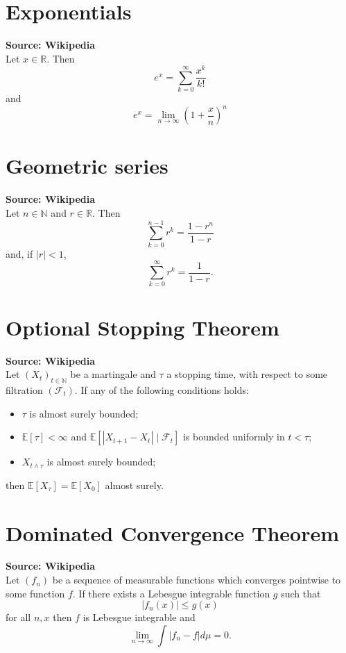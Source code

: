 \documentclass[fleqn]{article}
\newcommand{\E}{\mathbb{E}}
\newcommand{\1}[1]{\mathbb{I}_{#1}}
\begin{document}
\section{Exponentials}
\textbf{Source: Wikipedia} \\[10pt]
Let $x \in \mathbb{R}$.
Then
\begin{equation*}
e^x = \sum_{k=0}^\infty \frac{x^k}{k!}
\end{equation*}
and
\begin{equation*}
e^x = \lim_{n\to\infty} \left( 1+ \frac{x}{n} \right)^n
\end{equation*}


\section{Geometric series}
\textbf{Source: Wikipedia} \\[10pt]
Let $n\in\mathbb{N}$ and $r \in \mathbb{R}$.
Then
\begin{equation*}
\sum_{k=0}^{n-1} r^k = \frac{1-r^n}{1-r}
\end{equation*}
and, if $|r| <1$,
\begin{equation*}
\sum_{k=0}^\infty r^k = \frac{1}{1-r} .
\end{equation*}


\section{Optional Stopping Theorem}
\textbf{Source: Wikipedia} \\[10pt]
Let $(X_t)_{t\in\mathbb{N}}$ be a martingale and $\tau$ a stopping time, with respect to some filtration $(\mathcal{F}_t)$.
If any of the following conditions holds:
\begin{itemize}
\item $\tau$ is almost surely bounded;
\item $\E[\tau]<\infty$ and $\E[ |X_{t+1} - X_t| \mid \mathcal{F}_t]$ is bounded uniformly in $t<\tau$;
\item $X_{t\wedge\tau}$ is almost surely bounded;
\end{itemize}
then $\E[X_\tau] = \E[X_0]$ almost surely.


\section{Dominated Convergence Theorem}
\textbf{Source: Wikipedia} \\[10pt]
Let $(f_n)$ be a sequence of measurable functions which converges pointwise to some function $f$.
If there exists a Lebesgue integrable function $g$ such that 
\begin{equation*}
|f_n(x)| \leq g(x)
\end{equation*}
for all $n,x$
then $f$ is Lebesgue integrable and
\begin{equation*}
\lim_{n\to\infty} \int |f_n -f| d\mu =0 .
\end{equation*}
\end{document}
